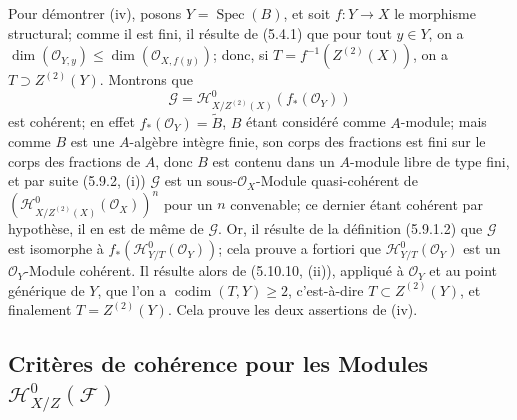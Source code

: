 Pour démontrer (iv), posons $Y=\operatorname{Spec}(B)$, et soit $f:Y\to X$ le
morphisme structural; comme il est fini, il résulte de (5.4.1) que pour tout
$y\in Y$, on a
$\dim(\mathcal O_{Y,y})\leq\dim(\mathcal O_{X,f(y)})$; donc, si
$T=f^{-1}(Z^{(2)}(X))$, on a $T\supset Z^{(2)}(Y)$. Montrons que
\[
\mathcal G=\mathcal H^0_{X/Z^{(2)}(X)}(f_*(\mathcal O_Y))
\]
est cohérent; en effet $f_*(\mathcal O_Y)=\widetilde B$, $B$ étant considéré
comme $A$-module; mais comme $B$ est une $A$-algèbre intègre finie, son corps
des fractions est fini sur le corps des fractions de $A$, donc $B$ est contenu
dans un $A$-module libre de type fini, et par suite (5.9.2, (i)) $\mathcal G$
est un sous-$\mathcal O_X$-Module quasi-cohérent de
$(\mathcal H^0_{X/Z^{(2)}(X)}(\mathcal O_X))^n$ pour un $n$ convenable; ce
dernier étant cohérent par hypothèse, il en est de même de $\mathcal G$. Or,
il résulte de la définition (5.9.1.2) que $\mathcal G$ est isomorphe à
$f_*(\mathcal H^0_{Y/T}(\mathcal O_Y))$; cela prouve a fortiori que
$\mathcal H^0_{Y/T}(\mathcal O_Y)$ est un $\mathcal O_Y$-Module cohérent. Il
résulte alors de (5.10.10, (ii)), appliqué à $\mathcal O_Y$ et au point
générique de $Y$, que l'on a $\operatorname{codim}(T,Y)\geq2$, c'est-à-dire
$T\subset Z^{(2)}(Y)$, et finalement $T=Z^{(2)}(Y)$. Cela prouve les deux
assertions de (iv).


\subsection{Critères de cohérence pour les Modules
$\mathcal H^0_{X/Z}(\mathcal F)$}


